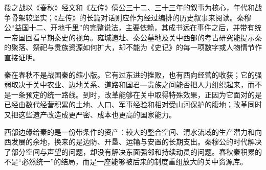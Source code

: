 \begin{sourcenote}
殽之战以《春秋》经文和《左传》僖公三十二、三十三年的叙事为核心，年代和战争骨架较坚实；《左传》的长篇对话则应作为经过编排的历史叙事来阅读。秦穆公“益国十二、开地千里”的完整说法，主要依赖，其成书远在事件之后，并带有统一帝国回看早期秦史的视角。雍城遗址、秦公墓地及关中西部的考古研究能提示秦的聚落、祭祀与贵族资源如何扩大，却不能为《史记》的每一项数字或人物情节作直接证明。
\end{sourcenote}

秦在春秋不是战国秦的缩小版。它有过东进的挫败，也有西向经营的收获；它的强弱取决于关中农业、边地关系、道路和国君—贵族之间能否把人力组织起来，而不是一条预定的统一路线。到时，改革能够在关中取得特殊效果，正因为它面对的是已经由数代经营积累的土地、人口、军事经验和相对受山河保护的腹地；改革同时又把这些遗产改造成更严密、成本也更高的国家能力。

\begin{turningpoint}
西部边缘给秦的是一份带条件的资产：较大的整合空间、渭水流域的生产潜力和向西发展的余地，换来的是边防、开垦、运输与安置的长期支出。秦穆公的时代解决了部分空间与声望的问题，却没有解决东面强邻和持续动员的问题。春秋秦积累的不是“必然统一”的结局，而是一座能够被后来的制度重组放大的关中资源库。
\end{turningpoint}
